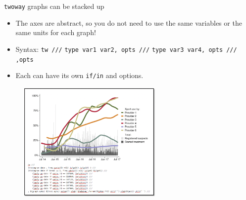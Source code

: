 \documentclass[aspectratio=169]{beamer}
\begin{document}
\begin{frame}{ \texttt{twoway} graphs can be stacked up}
	\begin{multicols}{2}	
		
		\begin{itemize}[<default overlay specification>]
			\item<1> The axes are abstract, so you do not need to use the same variables or the same units for each graph!
			\item<1> Syntax: 
				\newline \texttt{tw ///}
				\newline \texttt{type var1 var2, opts ///}
				\newline \texttt{type var3 var4, opts ///}
				\newline \texttt{,opts}
			\item<1> Each can have its own  \texttt{if/in} and options.
		\end{itemize}
		
		\begin{figure}
			\centering
			\includegraphics[width=70mm]{img/Graph3}
		\end{figure}
		
	\end{multicols}
\end{frame}
\end{document}
